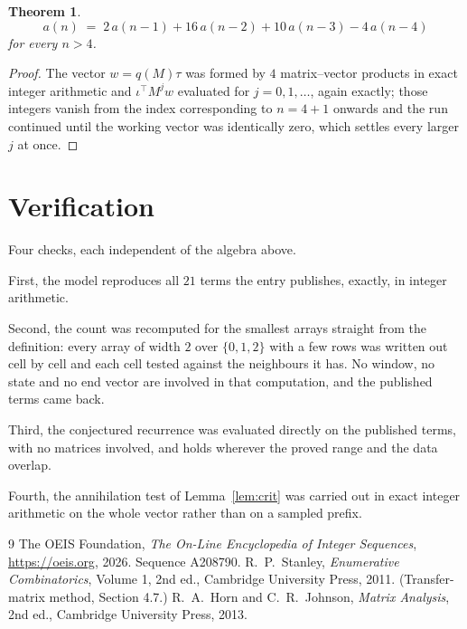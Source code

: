 \documentclass[11pt,a4paper]{article}
\theoremstyle{plain}
\newtheorem{theorem}{Theorem}
\theoremstyle{definition}
\begin{document}
\begin{theorem}
\[
a(n)\;=\;2\,a(n-1) + 16\,a(n-2) + 10\,a(n-3) - 4\,a(n-4)
\]
for every $n>4$.
\end{theorem}

\begin{proof}
The vector $w=q(M)\tau$ was formed by $4$ matrix--vector products in exact integer
arithmetic and $\iota^{\!\top}M^{j}w$ evaluated for $j=0,1,\dots$, again exactly; those
integers vanish from the index corresponding to $n=4+1$ onwards and the run continued
until the working vector was identically zero, which settles every larger $j$ at once.
\end{proof}

\section{Verification}

Four checks, each independent of the algebra above.

First, the model reproduces all $21$ terms the entry publishes, exactly, in integer
arithmetic.

Second, the count was recomputed for the smallest arrays straight from the definition: every
array of width $2$ over $\{0,1,2\}$ with a few rows was written out cell by cell and each cell
tested against the neighbours it has. No window, no state and no end vector are involved in that
computation, and the published terms came back.

Third, the conjectured recurrence was evaluated directly on the published terms, with no
matrices involved, and holds wherever the proved range and the data overlap.

Fourth, the annihilation test of Lemma~\ref{lem:crit} was carried out in exact integer
arithmetic on the whole vector rather than on a sampled prefix.

\begin{thebibliography}{9}
 The OEIS Foundation, \emph{The On-Line Encyclopedia of Integer
Sequences}, \url{https://oeis.org}, 2026. Sequence A208790.
 R.~P.~Stanley, \emph{Enumerative Combinatorics}, Volume 1, 2nd ed.,
Cambridge University Press, 2011. (Transfer-matrix method, Section 4.7.)
 R.~A.~Horn and C.~R.~Johnson, \emph{Matrix Analysis}, 2nd ed., Cambridge
University Press, 2013.
\end{thebibliography}
\end{document}
